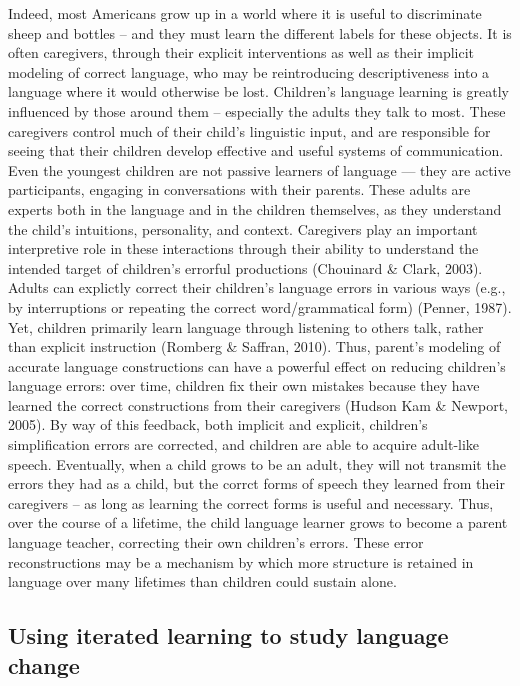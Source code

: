 \documentclass[10pt, letterpaper]{article}
\begin{document}
Indeed, most Americans grow up in a world where it is useful to
discriminate sheep and bottles -- and they must learn the different
labels for these objects. It is often caregivers, through their explicit
interventions as well as their implicit modeling of correct language,
who may be reintroducing descriptiveness into a language where it would
otherwise be lost. Children's language learning is greatly influenced by
those around them -- especially the adults they talk to most. These
caregivers control much of their child's linguistic input, and are
responsible for seeing that their children develop effective and useful
systems of communication. Even the youngest children are not passive
learners of language --- they are active participants, engaging in
conversations with their parents. These adults are experts both in the
language and in the children themselves, as they understand the child's
intuitions, personality, and context. Caregivers play an important
interpretive role in these interactions through their ability to
understand the intended target of children's errorful productions
(Chouinard \& Clark, 2003). Adults can explictly correct their
children's language errors in various ways (e.g., by interruptions or
repeating the correct word/grammatical form) (Penner, 1987). Yet,
children primarily learn language through listening to others talk,
rather than explicit instruction (Romberg \& Saffran, 2010). Thus,
parent's modeling of accurate language constructions can have a powerful
effect on reducing children's language errors: over time, children fix
their own mistakes because they have learned the correct constructions
from their caregivers (Hudson Kam \& Newport, 2005). By way of this
feedback, both implicit and explicit, children's simplification errors
are corrected, and children are able to acquire adult-like speech.
Eventually, when a child grows to be an adult, they will not transmit
the errors they had as a child, but the corrct forms of speech they
learned from their caregivers -- as long as learning the correct forms
is useful and necessary. Thus, over the course of a lifetime, the child
language learner grows to become a parent language teacher, correcting
their own children's errors. These error reconstructions may be a
mechanism by which more structure is retained in language over many
lifetimes than children could sustain alone.

\subsection{Using iterated learning to study language
change}\label{using-iterated-learning-to-study-language-change}
\end{document}
